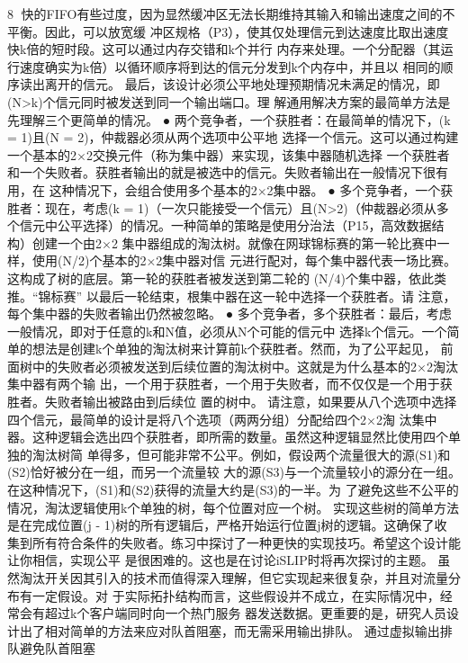                                                        8
快的FIFO有些过度，因为显然缓冲区无法长期维持其输入和输出速度之间的不平衡。因此，可以放宽缓
冲区规格（P3），使其仅处理信元到达速度比取出速度快k倍的短时段。这可以通过内存交错和k个并行
内存来处理。一个分配器（其运行速度确实为k倍）以循环顺序将到达的信元分发到k个内存中，并且以
相同的顺序读出离开的信元。
最后，该设计必须公平地处理预期情况未满足的情况，即(N>k)个信元同时被发送到同一个输出端口。理
解通用解决方案的最简单方法是先理解三个更简单的情况。
 ● 两个竞争者，一个获胜者：在最简单的情况下，(k = 1)且(N = 2)，仲裁器必须从两个选项中公平地
   选择一个信元。这可以通过构建一个基本的2×2交换元件（称为集中器）来实现，该集中器随机选择
   一个获胜者和一个失败者。获胜者输出的就是被选中的信元。失败者输出在一般情况下很有用，在
   这种情况下，会组合使用多个基本的2×2集中器。
 ● 多个竞争者，一个获胜者：现在，考虑(k = 1)（一次只能接受一个信元）且(N>2)（仲裁器必须从多
   个信元中公平选择）的情况。一种简单的策略是使用分治法（P15，高效数据结构）创建一个由2×2
   集中器组成的淘汰树。就像在网球锦标赛的第一轮比赛中一样，使用(N/2)个基本的2×2集中器对信
   元进行配对，每个集中器代表一场比赛。这构成了树的底层。第一轮的获胜者被发送到第二轮的
   (N/4)个集中器，依此类推。“锦标赛” 以最后一轮结束，根集中器在这一轮中选择一个获胜者。请
   注意，每个集中器的失败者输出仍然被忽略。
 ● 多个竞争者，多个获胜者：最后，考虑一般情况，即对于任意的k和N值，必须从N个可能的信元中
   选择k个信元。一个简单的想法是创建k个单独的淘汰树来计算前k个获胜者。然而，为了公平起见，
   前面树中的失败者必须被发送到后续位置的淘汰树中。这就是为什么基本的2×2淘汰集中器有两个输
   出，一个用于获胜者，一个用于失败者，而不仅仅是一个用于获胜者。失败者输出被路由到后续位
   置的树中。
请注意，如果要从八个选项中选择四个信元，最简单的设计是将八个选项（两两分组）分配给四个2×2淘
汰集中器。这种逻辑会选出四个获胜者，即所需的数量。虽然这种逻辑显然比使用四个单独的淘汰树简
单得多，但可能非常不公平。例如，假设两个流量很大的源(S1)和(S2)恰好被分在一组，而另一个流量较
大的源(S3)与一个流量较小的源分在一组。在这种情况下，(S1)和(S2)获得的流量大约是(S3)的一半。为
了避免这些不公平的情况，淘汰逻辑使用k个单独的树，每个位置对应一个树。
实现这些树的简单方法是在完成位置(j - 1)树的所有逻辑后，严格开始运行位置j树的逻辑。这确保了收
集到所有符合条件的失败者。练习中探讨了一种更快的实现技巧。希望这个设计能让你相信，实现公平
是很困难的。这也是在讨论iSLIP时将再次探讨的主题。
虽然淘汰开关因其引入的技术而值得深入理解，但它实现起来很复杂，并且对流量分布有一定假设。对
于实际拓扑结构而言，这些假设并不成立，在实际情况中，经常会有超过k个客户端同时向一个热门服务
器发送数据。更重要的是，研究人员设计出了相对简单的方法来应对队首阻塞，而无需采用输出排队。
通过虚拟输出排队避免队首阻塞

